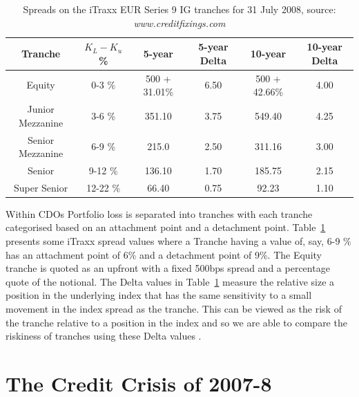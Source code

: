 {\begin{table}[ht]
\begin{center}
\begin{tabular}{||c|c|c|c|c|c||}
\hline \bf{Tranche} & \bf{$K_L - K_u$ \%} & \bf{5-year} & \bf{5-year Delta} & \bf{10-year} & \bf{10-year Delta} \\ 
\hline Equity & 0-3 \% & 500 + 31.01\% & 6.50 & 500 + 42.66\% & 4.00\\ 
\hline Junior Mezzanine & 3-6 \% & 351.10 & 3.75 & 549.40  & 4.25 \\ 
\hline Senior Mezzanine & 6-9 \% & 215.0 &  2.50 & 311.16 & 3.00 \\ 
\hline Senior & 9-12 \% & 136.10 &  1.70 & 185.75 & 2.15 \\ 
\hline Super Senior & 12-22 \% & 66.40 &  0.75 & 92.23 & 1.10 \\ 
\hline 
\end{tabular} 
\end{center}
\caption{\label{table:31Jul08}Spreads on the iTraxx EUR Series 9 IG tranches for 31 July 2008, source: \it{www.creditfixings.com}}
\end{table}
}

Within CDOs Portfolio loss is separated into tranches with each tranche categorised based on an attachment point and a detachment point.  Table~\ref{table:31Jul08} presents some iTraxx spread values where a Tranche having a value of, say, 6-9 \% has an attachment point of 6\% and a detachment point of 9\%. The Equity tranche is quoted as an upfront with a fixed 500bps spread and a percentage quote of the notional. The Delta values in Table~\ref{table:31Jul08} measure the relative size a position in the underlying index that has the same sensitivity to a small movement in the index spread as the tranche.  This can be viewed as the risk of the tranche relative to a position in the index and so we are able to compare the riskiness of tranches using these Delta values \cite{Gib2007}.  


\section{The Credit Crisis of 2007-8}

